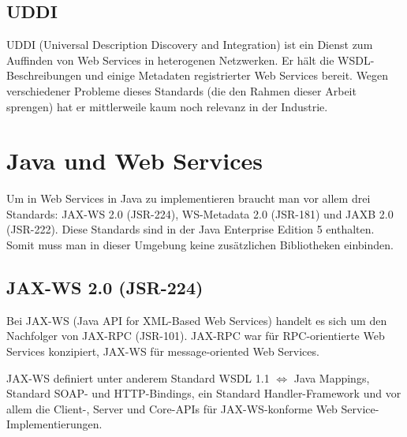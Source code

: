 \documentclass[runningheads]{llncs}
\begin{document}
  \label{uddi}
  \subsection{UDDI}
    UDDI\cite{wk_uddi} (Universal Description Discovery and Integration) ist ein Dienst zum
    Auffinden von Web Services in heterogenen Netzwerken. Er hält die WSDL-Beschreibungen und
    einige Metadaten registrierter Web Services bereit. Wegen verschiedener Probleme dieses
    Standards (die den Rahmen dieser Arbeit sprengen) hat er mittlerweile kaum noch relevanz in der
    Industrie.


  \label{wsj}
  \section{Java und Web Services}
    Um in Web Services in Java zu implementieren braucht man vor allem drei Standards: JAX-WS 2.0 (JSR-224), WS-Metadata 2.0 (JSR-181) und JAXB 2.0 (JSR-222). Diese Standards sind in der Java Enterprise Edition 5 enthalten. Somit muss man in dieser Umgebung keine zusätzlichen Bibliotheken einbinden.


  \label{jsr224}
  \subsection{JAX-WS 2.0 (JSR-224)}
    Bei JAX-WS\cite{jsr_224} (Java API for XML-Based Web Services) handelt es sich um den Nachfolger von JAX-RPC (JSR-101). JAX-RPC war für RPC-orientierte Web Services konzipiert, JAX-WS für message-oriented Web Services.

    JAX-WS definiert unter anderem Standard WSDL 1.1 $\Leftrightarrow$ Java Mappings, Standard SOAP- und HTTP-Bindings, ein Standard Handler-Framework und vor allem die Client-, Server und Core-APIs für JAX-WS-konforme Web Service-Im\-ple\-men\-tier\-ung\-en. \vfill
\end{document}
